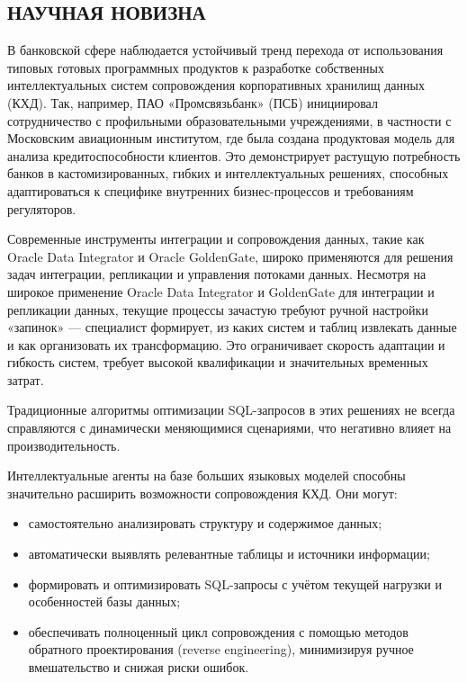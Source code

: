 \subsection{НАУЧНАЯ НОВИЗНА}

В банковской сфере наблюдается устойчивый тренд перехода от использования типовых готовых программных продуктов к разработке собственных интеллектуальных систем сопровождения корпоративных хранилищ данных (КХД). Так, например, ПАО «Промсвязьбанк» (ПСБ) инициировал сотрудничество с профильными образовательными учреждениями, в частности с Московским авиационным институтом, где была создана продуктовая модель для анализа кредитоспособности клиентов. Это демонстрирует растущую потребность банков в кастомизированных, гибких и интеллектуальных решениях, способных адаптироваться к специфике внутренних бизнес-процессов и требованиям регуляторов.

Современные инструменты интеграции и сопровождения данных, такие как Oracle Data Integrator и Oracle GoldenGate, широко применяются для решения задач интеграции, репликации и управления потоками данных. Несмотря на широкое применение Oracle Data Integrator и GoldenGate для интеграции и репликации данных, текущие процессы зачастую требуют ручной настройки «запинок» — специалист формирует, из каких систем и таблиц извлекать данные и как организовать их трансформацию. Это ограничивает скорость адаптации и гибкость систем, требует высокой квалификации и значительных временных затрат.

Традиционные алгоритмы оптимизации SQL-запросов в этих решениях не всегда справляются с динамически меняющимися сценариями, что негативно влияет на производительность.

Интеллектуальные агенты на базе больших языковых моделей способны значительно расширить возможности сопровождения КХД. Они могут:
\begin{itemize}
    \item самостоятельно анализировать структуру и содержимое данных;
    \item автоматически выявлять релевантные таблицы и источники информации;
    \item формировать и оптимизировать SQL-запросы с учётом текущей нагрузки и особенностей базы данных;
    \item обеспечивать полноценный цикл сопровождения с помощью методов обратного проектирования (reverse engineering), минимизируя ручное вмешательство и снижая риски ошибок.
\end{itemize}


